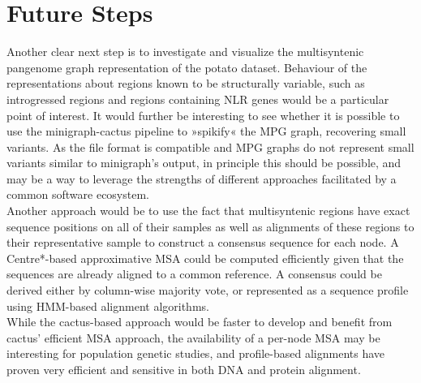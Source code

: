 \section*{Future Steps}

Another clear next step is to investigate and visualize the multisyntenic pangenome graph representation of the potato dataset.
Behaviour of the representations about regions known to be structurally variable, such as introgressed regions and regions containing NLR genes would be a particular point of interest.
It would further be interesting to see whether it is possible to use the minigraph-cactus pipeline to »spikify« the MPG graph, recovering small variants\cite{hickey24}.
As the file format is compatible and MPG graphs do not represent small variants similar to minigraph's output, in principle this should be possible, and may be a way to leverage the strengths of different approaches facilitated by a common software ecosystem.\\
Another approach would be to use the fact that multisyntenic regions have exact sequence positions on all of their samples as well as alignments of these regions to their representative sample to construct a consensus sequence for each node.
A Centre*-based approximative MSA could be computed efficiently given that the sequences are already aligned to a common reference.
A consensus could be derived either by column-wise majority vote, or represented as a sequence profile using HMM-based alignment algorithms\cite{remmert12}.\\
While the cactus-based approach would be faster to develop and benefit from cactus' efficient MSA approach\cite{armstrong20}, the availability of a per-node MSA may be interesting for population genetic studies, and profile-based alignments have proven very efficient and sensitive in both DNA and protein alignment\cite{tempel12, pfam20}.

